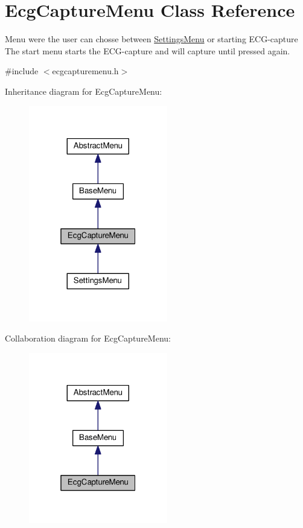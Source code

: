 \hypertarget{classEcgCaptureMenu}{}\section{Ecg\+Capture\+Menu Class Reference}
\label{classEcgCaptureMenu}


Menu were the user can chosse between \hyperlink{classSettingsMenu}{Settings\+Menu} or starting E\+C\+G-\/capture The start menu starts the E\+C\+G-\/capture and will capture until pressed again.  




{\ttfamily \#include $<$ecgcapturemenu.\+h$>$}



Inheritance diagram for Ecg\+Capture\+Menu\+:\nopagebreak
\begin{figure}[H]
\begin{center}
\leavevmode
\includegraphics[width=172pt]{classEcgCaptureMenu__inherit__graph}
\end{center}
\end{figure}


Collaboration diagram for Ecg\+Capture\+Menu\+:\nopagebreak
\begin{figure}[H]
\begin{center}
\leavevmode
\includegraphics[width=172pt]{classEcgCaptureMenu__coll__graph}
\end{center}
\end{figure}
